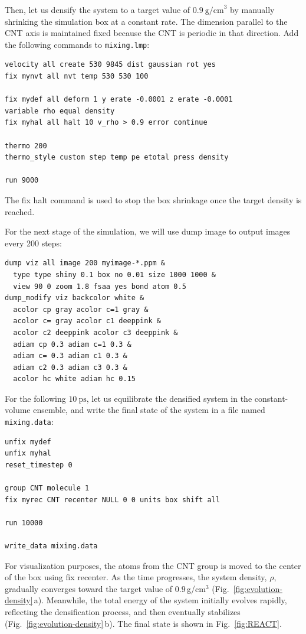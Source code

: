 \documentclass[9pt,tutorial]{livecoms}
\newcommand{\lmpcmd}[1]{\colorbox{listing}{\textcolor{command}{\small{#1}}}} %
\newcommand{\flecmd}[1]{\textcolor{command}{\texttt{#1}}} %
\begin{document}
Then, let us densify the system to a target value of $0.9~\text{g/cm}^3$
by manually shrinking the simulation box at a constant rate.  The dimension parallel
to the CNT axis is maintained fixed because the CNT is periodic in that direction.
Add the following commands to \flecmd{mixing.lmp}:
\begin{lstlisting}
velocity all create 530 9845 dist gaussian rot yes
fix mynvt all nvt temp 530 530 100

fix mydef all deform 1 y erate -0.0001 z erate -0.0001
variable rho equal density
fix myhal all halt 10 v_rho > 0.9 error continue

thermo 200
thermo_style custom step temp pe etotal press density

run 9000
\end{lstlisting}
The \lmpcmd{fix halt} command is used to stop the box shrinkage once the
target density is reached.

For the next stage of the simulation, we will use \lmpcmd{dump image} to
output images every 200 steps:
\begin{lstlisting}
dump viz all image 200 myimage-*.ppm &
  type type shiny 0.1 box no 0.01 size 1000 1000 &
  view 90 0 zoom 1.8 fsaa yes bond atom 0.5
dump_modify viz backcolor white &
  acolor cp gray acolor c=1 gray &
  acolor c= gray acolor c1 deeppink &
  acolor c2 deeppink acolor c3 deeppink &
  adiam cp 0.3 adiam c=1 0.3 &
  adiam c= 0.3 adiam c1 0.3 &
  adiam c2 0.3 adiam c3 0.3 &
  acolor hc white adiam hc 0.15
\end{lstlisting}
For the following $10~\text{ps}$, let us equilibrate the densified system
in the constant-volume ensemble, and write the final state of the
system in a file named \flecmd{mixing.data}:
\begin{lstlisting}
unfix mydef
unfix myhal
reset_timestep 0

group CNT molecule 1
fix myrec CNT recenter NULL 0 0 units box shift all

run 10000

write_data mixing.data
\end{lstlisting}
For visualization purposes, the atoms from the CNT \lmpcmd{group} is moved
to the center of the box using \lmpcmd{fix recenter}.
As the time progresses, the system density,
$\rho$, gradually converges toward the {\color{blue}target value of $0.9$\,g/cm$^3$} (Fig.~\ref{fig:evolution-density}\,a).
Meanwhile, the total energy of the system initially evolves rapidly, reflecting the
densification process, and then eventually stabilizes (Fig.~\ref{fig:evolution-density}\,b).
The final state is shown in Fig.~\ref{fig:REACT}.
\end{document}
